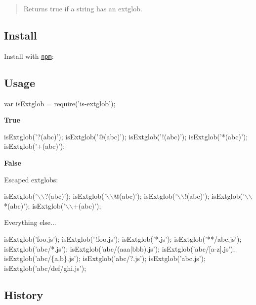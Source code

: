 \begin{quote}
Returns true if a string has an extglob. \end{quote}


\subsection*{Install}

Install with \href{https://www.npmjs.com/}{\tt npm}\+:




\subsection*{Usage}


\begin{DoxyCode}
var isExtglob = require('is-extglob');
\end{DoxyCode}


{\bfseries True}


\begin{DoxyCode}
isExtglob('?(abc)');
isExtglob('@(abc)');
isExtglob('!(abc)');
isExtglob('*(abc)');
isExtglob('+(abc)');
\end{DoxyCode}


{\bfseries False}

Escaped extglobs\+:


\begin{DoxyCode}
isExtglob('\(\backslash\)\(\backslash\)?(abc)');
isExtglob('\(\backslash\)\(\backslash\)@(abc)');
isExtglob('\(\backslash\)\(\backslash\)!(abc)');
isExtglob('\(\backslash\)\(\backslash\)*(abc)');
isExtglob('\(\backslash\)\(\backslash\)+(abc)');
\end{DoxyCode}


Everything else...


\begin{DoxyCode}
isExtglob('foo.js');
isExtglob('!foo.js');
isExtglob('*.js');
isExtglob('**/abc.js');
isExtglob('abc/*.js');
isExtglob('abc/(aaa|bbb).js');
isExtglob('abc/[a-z].js');
isExtglob('abc/\{a,b\}.js');
isExtglob('abc/?.js');
isExtglob('abc.js');
isExtglob('abc/def/ghi.js');
\end{DoxyCode}


\subsection*{History}

